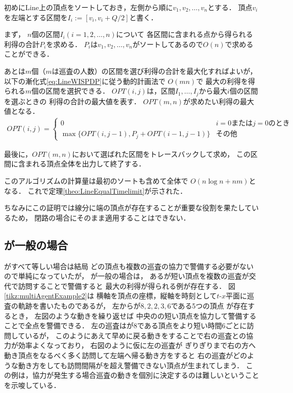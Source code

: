 初めにLine上の頂点をソートしておき，左側から順に$v_1,v_2,\ldots,v_n$とする．
頂点$v_i$を左端とする区間を$I_i := [v_i, v_i + Q/2]$と書く．

まず，
$n$個の区間$I_i (i = 1,2,\ldots, n)$について
各区間に含まれる点から得られる利得の合計$P_i$を求める．
$P_i$は$v_1,v_2,\ldots,v_n$がソートしてあるので$O(n)$で求めることができる．

あとは$m$個（$m$は巡査の人数）の区間を選び利得の合計を最大化すればよいが，
以下の漸化式\ref{eq:LineWISPDP}に従う動的計画法で
$O(mn)$で
最大の利得を得られる$m$個の区間を選択できる．
$OPT(i,j)$は，区間$I_1, \ldots, I_j$から最大$i$個の区間を選ぶときの
利得の合計の最大値を表す．
$OPT(m,n)$が求めたい利得の最大値となる．
\begin{align}
    \label{eq:LineWISPDP}
    OPT(i,j) = 
    \begin{cases}
        0 & \text{$i = 0$または$j = 0$のとき} \\
        \max \{
            OPT(i, j - 1), 
            P_j + OPT(i - 1, j - 1)
        \}
        & \text{その他}
    \end{cases}
\end{align}

最後に，$OPT(m,n)$において選ばれた区間をトレースバックして求め，
この区間に含まれる頂点全体を出力して終了する．

このアルゴリズムの計算量は最初のソートも含めて全体で
$O(n \log n + nm)$となる．
これで定理\ref{theo:LineEqualTimelimit}が示された．



ちなみにこの証明では線分に端の頂点が存在することが重要な役割を果たしているため，
閉路の場合にそのまま適用することはできない．







\subsection{{\timelimit}が一般の場合}
\label{subsec:LineDifferentTimelimit}

{\timelimit}がすべて等しい場合は結局
どの頂点も複数の巡査の協力で警備する必要がないので単純になっていたが，
%
{\timelimit}が一般の場合は，
ある{\timelimit}が短い頂点を複数の巡査が交代で訪問することで警備すると
最大の利得が得られる例が存在する．
%
図\ref{tikz:multiAgentExample2}は
横軸を頂点の座標，縦軸を時刻として$t$-$x$平面に巡査の軌跡を書いたものであるが，
%
左から{\timelimit}が$8,2,2,3,6$である5つの頂点
が存在するとき，
左図のような動きを繰り返せば
中央の{\timelimit}の短い頂点を協力して警備することで全点を警備できる．
左の巡査は{\timelimit}が$8$である頂点をより短い時間$6$ごとに訪問しているが，
このようにあえて早めに戻る動きをすることで右の巡査との協力が効率よくなっており，
右図のように仮に左の巡査が
{\timelimit}ぎりぎりまで右の方へ動き頂点をなるべく多く訪問して左端へ帰る動き方をすると
右の巡査がどのような動き方をしても訪問間隔が{\timelimit}を超え警備できない頂点が生まれてしまう．
%
この例は，協力が発生する場合巡査の動きを個別に決定するのは難しいということを示唆している．
%


